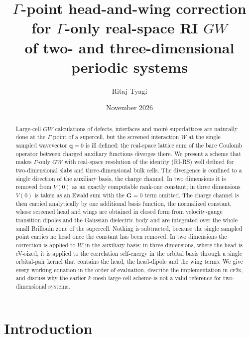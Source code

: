 \documentclass[%
 reprint,
superscriptaddress,
 amsmath,amssymb,
 aps,
prb,
]{revtex4-2}
\newcommand{\bq}{\mathbf{q}}
\newcommand{\bG}{\mathbf{G}}
\newcommand{\cpk}{\textsc{cp2k}}
\begin{document}
\title{$\Gamma$-point head-and-wing correction for $\Gamma$-only real-space RI $GW$\\
of two- and three-dimensional periodic systems}

\author{Ritaj Tyagi}

\date{November 2026}

\begin{abstract}
Large-cell $GW$ calculations of defects, interfaces and moir\'e superlattices are naturally
done at the $\Gamma$ point of a supercell, but the screened interaction $W$ at the single
sampled wavevector $\bq=0$ is ill defined: the real-space lattice sum of the bare Coulomb
operator between charged auxiliary functions diverges there. We present a scheme that makes
$\Gamma$-only $GW$ with real-space resolution of the identity (RI-RS) well defined for
two-dimensional slabs and three-dimensional bulk cells. The divergence is confined to a single
direction of the auxiliary basis, the charge channel. In two dimensions it is removed from
$V(0)$ as an exactly computable rank-one constant; in three dimensions $V(0)$ is taken as an
Ewald sum with the $\bG=0$ term omitted. The charge channel is then carried analytically by one
additional basis function, the normalized constant, whose screened head and wings are obtained
in closed form from velocity-gauge transition dipoles and the Gaussian dielectric body and are
integrated over the whole small Brillouin zone of the supercell. Nothing is subtracted, because
the single sampled point carries no head once the constant has been removed. In two dimensions
the correction is applied to $W$ in the auxiliary basis; in three dimensions, where the head is
eV-sized, it is applied to the correlation self-energy in the orbital basis through a single
orbital-pair kernel that contains the head, the head-dipole and the wing terms. We give every
working equation in the order of evaluation, describe the implementation in \cpk{}, and discuss
why the earlier $k$-mesh large-cell scheme is not a valid reference for two-dimensional systems.
\end{abstract}

\maketitle

\section{Introduction}
\label{sec:intro}
\end{document}
